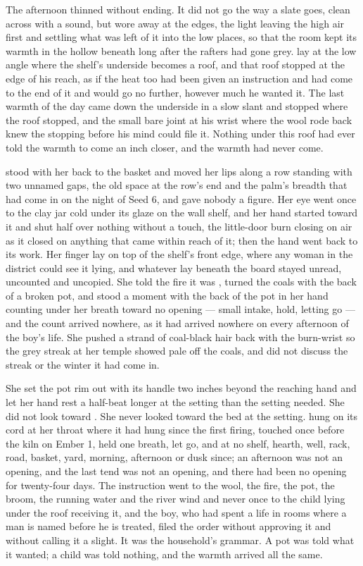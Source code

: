 The afternoon thinned without ending. It did not go the way a slate goes, clean across with a sound, but wore away at the edges, the light leaving the high air first and settling what was left of it into the low places, so that the room kept its warmth in the hollow beneath  long after the rafters had gone grey.  lay at the low angle where the shelf's underside becomes a roof, and that roof stopped at the edge of his reach, as if the heat too had been given an instruction and had come to the end of it and would go no further, however much he wanted it. The last warmth of the day came down the underside in a slow slant and stopped where the roof stopped, and the small bare joint at his wrist where the wool rode back knew the stopping before his mind could file it. Nothing under this roof had ever told the warmth to come an inch closer, and the warmth had never come.

 stood with her back to the basket and moved her lips along a row standing with two unnamed gaps, the old space at the row's end and the palm's breadth that had come in on the night of Seed 6, and gave nobody a figure. Her eye went once to the clay jar cold under its glaze on the wall shelf, and her hand started toward it and shut half over nothing without a touch, the little-door burn closing on air as it closed on anything that came within reach of it; then the hand went back to its work. Her finger lay on top of the shelf's front edge, where any woman in the district could see it lying, and whatever lay beneath the board stayed unread, uncounted and uncopied. She told the fire it was , turned the coals with the back of a broken pot, and stood a moment with the back of the pot in her hand counting under her breath toward no opening --- small intake, hold, letting go --- and the count arrived nowhere, as it had arrived nowhere on every afternoon of the boy's life. She pushed a strand of coal-black hair back with the burn-wrist so the grey streak at her temple showed pale off the coals, and did not discuss the streak or the winter it had come in.

She set the pot rim out with its handle two inches beyond the reaching hand and let her hand rest a half-beat longer at the setting than the setting needed. She did not look toward . She never looked toward the bed at the setting.  hung on its cord at her throat where it had hung since the first firing, touched once before the kiln on Ember 1, held one breath, let go, and at no shelf, hearth, well, rack, road, basket, yard, morning, afternoon or dusk since; an afternoon was not an opening, and the last tend was not an opening, and there had been no opening for twenty-four days. The instruction went to the wool, the fire, the pot, the broom, the running water and the river wind and never once to the child lying under the roof receiving it, and the boy, who had spent a life in rooms where a man is named before he is treated, filed the order without approving it and without calling it a slight. It was the household's grammar. A pot was told what it wanted; a child was told nothing, and the warmth arrived all the same.

